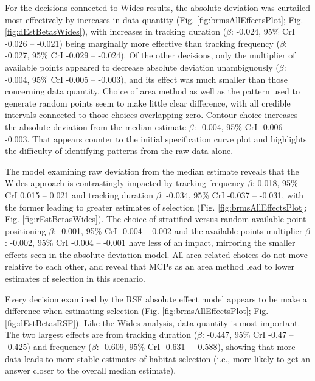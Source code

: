 \documentclass[10pt,a4paper]{article}
\begin{document}
For the decisions connected to Wides results, the absolute deviation was curtailed most effectively by increases in data quantity (Fig. \ref{fig:brmsAllEffectsPlot}; Fig. \ref{fig:dEstBetasWides}), with increases in tracking duration (\(\beta\): -0.024, 95\% CrI -0.026 -- -0.021) being marginally more effective than tracking frequency (\(\beta\): -0.027, 95\% CrI -0.029 -- -0.024).
Of the other decisions, only the multiplier of available points appeared to decrease absolute deviation unambiguously (\(\beta\): -0.004, 95\% CrI -0.005 -- -0.003), and its effect was much smaller than those concerning data quantity.
Choice of area method as well as the pattern used to generate random points seem to make little clear difference, with all credible intervals connected to those choices overlapping zero.
Contour choice increases the absolute deviation from the median estimate \(\beta\): -0.004, 95\% CrI -0.006 -- -0.003.
That appears counter to the initial specification curve plot and highlights the difficulty of identifying patterns from the raw data alone.

The model examining raw deviation from the median estimate reveals that the Wides approach is contrastingly impacted by tracking frequency \(\beta\): 0.018, 95\% CrI 0.015 -- 0.021 and tracking duration \(\beta\): -0.034, 95\% CrI -0.037 -- -0.031, with the former leading to greater estimates of selection (Fig. \ref{fig:brmsAllEffectsPlot}; Fig. \ref{fig:rEstBetasWides}).
The choice of stratified versus random available point positioning \(\beta\): -0.001, 95\% CrI -0.004 -- 0.002 and the available points multiplier \(\beta\): -0.002, 95\% CrI -0.004 -- -0.001 have less of an impact, mirroring the smaller effects seen in the absolute deviation model.
All area related choices do not move relative to each other, and reveal that MCPs as an area method lead to lower estimates of selection in this scenario.

Every decision examined by the RSF absolute effect model appears to be make a difference when estimating selection (Fig. \ref{fig:brmsAllEffectsPlot}; Fig. \ref{fig:dEstBetasRSF}).
Like the Wides analysis, data quantity is most important.
The two largest effects are from tracking duration (\(\beta\): -0.447, 95\% CrI -0.47 -- -0.425) and frequency (\(\beta\): -0.609, 95\% CrI -0.631 -- -0.588), showing that more data leads to more stable estimates of habitat selection (i.e., more likely to get an answer closer to the overall median estimate).
\end{document}
